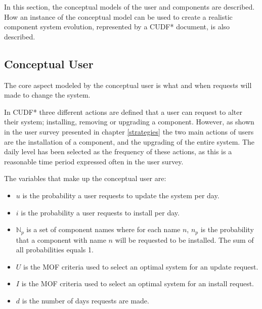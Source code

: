 In this section, the conceptual models of the user and components are described.
How an instance of the conceptual model can be used to create a realistic component system evolution, represented by a CUDF* document, is also described.

\subsection{Conceptual User}
The core aspect modeled by the conceptual user is what and when requests will made to change the system. 

In CUDF* three different actions are defined that a user can request to alter their system; installing, removing or upgrading a component.
However, as shown in the user survey presented in chapter \ref{strategies} the two main actions of users are the installation of a component, and the upgrading of the entire system.
The daily level has been selected as the frequency of these actions, as this is a reasonable time period expressed often in the user survey. 

The variables that make up the conceptual user are: 
\begin{itemize}
  \item $u$ is the probability a user requests to update the system per day.
  \item $i$ is the probability a user requests to install per day.
  \item $\mathbb{N}_p$ is a set of component names where for each name $n$, $n_p$ is the probability that a component with name $n$ will be requested to be installed.
  The sum of all probabilities equals 1.
  \item $U$ is the MOF criteria used to select an optimal system for an update request.
  \item $I$ is the MOF criteria used to select an optimal system for an install request.
  \item $d$ is the number of days requests are made.
\end{itemize}

